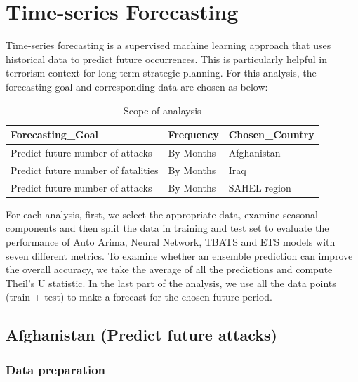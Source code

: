 \documentclass[11pt,oneside,a4paper]{reedthesis}
\begin{document}
\chapter{Time-series Forecasting}\label{time-series}

Time-series forecasting is a supervised machine learning approach that
uses historical data to predict future occurrences. This is particularly
helpful in terrorism context for long-term strategic planning. For this
analysis, the forecasting goal and corresponding data are chosen as
below:
\begin{table}[H]

\caption{\label{tab:unnamed-chunk-53}Scope of analaysis}
\centering
\begin{tabular}[t]{lll}
\toprule
Forecasting\_Goal & Frequency & Chosen\_Country\\
\midrule
Predict future number of attacks & By Months & Afghanistan\\
Predict future number of fatalities & By Months & Iraq\\
Predict future number of attacks & By Months & SAHEL region\\
\bottomrule
\end{tabular}
\end{table}
For each analysis, first, we select the appropriate data, examine
seasonal components and then split the data in training and test set to
evaluate the performance of Auto Arima, Neural Network, TBATS and ETS
models with seven different metrics. To examine whether an ensemble
prediction can improve the overall accuracy, we take the average of all
the predictions and compute Theil's U statistic. In the last part of the
analysis, we use all the data points (train + test) to make a forecast
for the chosen future period.

\section{Afghanistan (Predict future
attacks)}\label{afghanistan-predict-future-attacks}

\subsection{Data preparation}\label{data-preparation-3}
\end{document}
